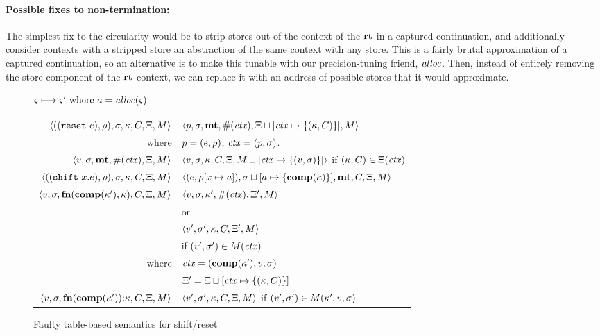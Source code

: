 \paragraph{Possible fixes to non-termination:} The simplest fix to the circularity would be to strip stores out of the context of the $\mathbf{rt}$ in a captured continuation, and additionally consider contexts with a stripped store an abstraction of the same context with any store.
%
This is a fairly brutal approximation of a captured continuation, so an alternative is to make this tunable with our precision-tuning friend, $\mathit{alloc}$.
%
Then, instead of entirely removing the store component of the $\mathbf{rt}$ context, we can replace it with an address of possible stores that it would approximate.

\begin{figure*}
  \centering
  $\varsigma \longmapsto \varsigma' \text{ where } a = \mathit{alloc}(\varsigma)$ \\
  \begin{tabular}{r|l}
    \hline
    $\langle ((\texttt{reset}\ e), \rho), \sigma, \kappa, C, \Xi, M \rangle$
    &
    $\langle p, \sigma, \mathbf{mt}, \#(\mathit{ctx}), \Xi\sqcup[\mathit{ctx} \mapsto \{ (\kappa,C) \}], M \rangle$
    \\
    where & $p = (e, \rho)$, $\mathit{ctx} = (p, \sigma)$.
    \\
    $\langle v, \sigma, \mathbf{mt}, \#(\mathit{ctx}), \Xi, M \rangle$
    &
    $\langle v, \sigma, {\kappa}, {C}, \Xi, M\sqcup[\mathit{ctx} \mapsto \{ (v,\sigma) \}] \rangle$
    if $(\kappa,C) \in \Xi(\mathit{ctx})$
    \\
    $\langle ((\texttt{shift}\ x. e), \rho), \sigma, \kappa, C, \Xi, M \rangle$
    &
    $\langle (e, \rho[x \mapsto a]), \sigma\sqcup[a \mapsto \{ \mathbf{comp}(\kappa) \}],\mathbf{mt},C,\Xi,M \rangle$
    \\
    $\langle v,\sigma,\mathbf{fn}{}(\mathbf{comp}(\kappa'), \kappa), C, \Xi, M \rangle$
    &
    $\langle v, \sigma, \kappa', \#(\mathit{ctx}), \Xi',M \rangle$
    \\
    & or \\
    & $\langle v', \sigma', \kappa, C, \Xi',M \rangle$
    \\ & \quad if $(v',\sigma') \in M(\mathit{ctx})$
    \\
    where & $\mathit{ctx} = (\mathbf{comp}(\kappa'), v, \sigma)$ \\
          & $\Xi' = \Xi\sqcup[\mathit{ctx} \mapsto \{ (\kappa,C) \}]$
    \\
    $\langle v,\sigma,\mathbf{fn}{}(\mathbf{comp}(\kappa')){\tt :} \kappa, C, \Xi, M \rangle$
    &
    $\langle v', \sigma', \kappa, C, \Xi,M \rangle$ if $(v',\sigma') \in M(\kappa',v,\sigma)$
  \end{tabular}  
  \caption{Faulty table-based semantics for shift/reset}
  \label{fig:shift-reset-table0}
\end{figure*}

